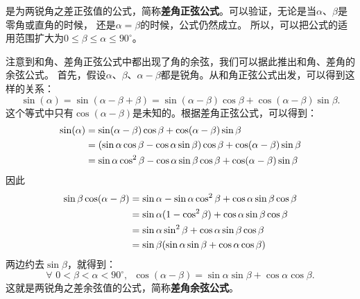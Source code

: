 \documentclass[12pt,UTF8]{ctexbook}
\begin{document}
是为两锐角之差正弦值的公式，简称\textbf{差角正弦公式}。可以验证，无论是当$\alpha$、$\beta$是零角或直角的时候，
还是$\alpha = \beta$的时候，公式仍然成立。
所以，可以把公式的适用范围扩大为$0 \leqslant \beta \leqslant \alpha \leqslant 90^\circ$。

注意到和角、差角正弦公式中都出现了角的余弦，我们可以据此推出和角、差角的余弦公式。
首先，假设$\alpha$、$\beta$、$\alpha - \beta$都是锐角。从和角正弦公式出发，可以得到这样的关系：
$$ \sin(\alpha) = \sin(\alpha - \beta + \beta) = \sin (\alpha - \beta) \cos \beta + \cos(\alpha - \beta) \sin\beta.$$
这个等式中只有$\cos(\alpha - \beta)$是未知的。根据差角正弦公式，可以得到：
\begin{align}
    \sin(\alpha) &= \sin (\alpha - \beta) \cos \beta + \cos(\alpha - \beta) \sin\beta \notag \\
    &= (\sin\alpha \cos \beta - \cos \alpha \sin\beta) \cos \beta + \cos(\alpha - \beta) \sin\beta \notag \\
    &= \sin\alpha \cos^2 \beta - \cos \alpha \sin\beta \cos \beta + \cos(\alpha - \beta) \sin\beta \notag
 \end{align}
因此
\begin{align}
    \sin\beta \cos(\alpha - \beta) &= \sin \alpha - \sin\alpha \cos^2 \beta + \cos \alpha \sin\beta \cos \beta \notag \\
    &= \sin \alpha (1 - \cos^2 \beta) + \cos \alpha \sin\beta \cos \beta \notag \\
    &= \sin\alpha \sin^2 \beta + \cos \alpha \sin\beta \cos \beta \notag \\
    &= \sin\beta (\sin\alpha \sin \beta +  \cos \alpha \cos \beta) \notag
 \end{align}
两边约去$\sin \beta$，就得到：
$$ \forall \,\, 0 <  \beta < \alpha < 90^\circ , \,\,\, \cos(\alpha - \beta) = \sin\alpha \sin \beta +  \cos \alpha \cos \beta. $$
这就是两锐角之差余弦值的公式，简称\textbf{差角余弦公式}。
\end{document}
